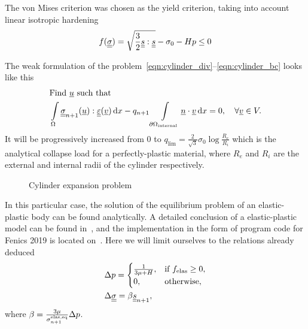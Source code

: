 \documentclass[12pt]{article}
\begin{document}
The von Mises criterion was chosen as the yield criterion, taking into account linear isotropic hardening
\begin{equation}\label{eqn:cylinder_von_mises}
    f(\underline{\underline{\sigma}}) = \sqrt{\frac{3}{2} \underline{\underline{s}} : \underline{\underline{s}}} - \sigma_0 - Hp \leq 0
\end{equation}

The weak formulation of the problem~\ref{eqn:cylinder_div}--\ref{eqn:cylinder_bc} looks like this
\begin{align}
    & \text{Find } \underline{u} \text{ such that} \label{eqn:cylinder_var_1} \\
    & \int\limits_\Omega\underline{\underline{\sigma}}_{n+1}(\underline{u}) : \underline{\underline{\varepsilon}}(\underline{v}) \, \mathrm{d} x - q_{n+1}\int\limits_{\partial\Omega_\text{internal}}\underline{n} \cdot \underline{v} \, \mathrm{d} x = 0, \quad \forall \underline{v} \in V. \label{eqn:cylinder_var_2}
\end{align}
It will be progressively increased from 0 to $q_\text{lim} = \frac{2}{\sqrt{3}}\sigma_0\log{\frac{R_e}{R_i}}$ which is the analytical collapse load for a perfectly-plastic material, where $R_e$ and $R_i$ are the external and internal radii of the cylinder respectively.

\begin{figure}[H]
    \begin{minipage}[h]{0.5\linewidth}
    \end{minipage}
    \hfill
    \begin{minipage}[h]{0.5\linewidth}
    \end{minipage}
    \caption{Cylinder expansion problem}
    \label{fig:domain}
\end{figure}

In this particular case, the solution of the equilibrium problem of an elastic-plastic body can be found analytically. A detailed conclusion of a elastic-plastic model can be found in~\parencite{bonnet:hal-01083772}, and the implementation in the form of program code for Fenics 2019 is located on~\parencite{bleyer2018numericaltours}. Here we will limit ourselves to the relations already deduced
\begin{align}
    &\Delta p = 
    \begin{cases}
        \frac{1}{3\mu + H}, & \text{if } f_\text{elas} \geq 0,\\
        0, & \text{otherwise},
    \end{cases} \label{eqn:dp_von_mises}\\
    &\Delta\underline{\underline{\sigma}} = \beta\underline{\underline{s}}_{n+1}, \label{eqn:dsigma_von_mises}
\end{align}
where $\beta = \frac{3\mu}{\sigma_{n+1}^\text{elas,eq}}\Delta p$.
\end{document}
